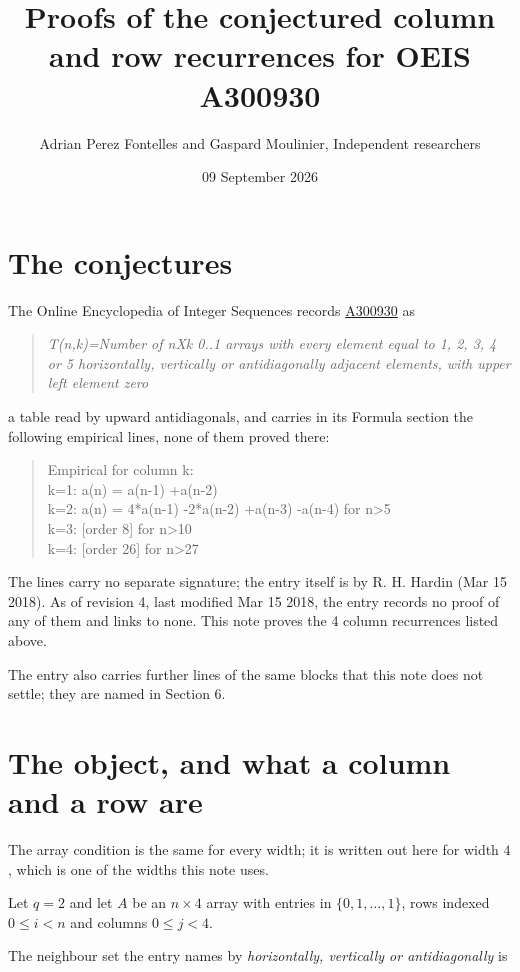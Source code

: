 \documentclass[11pt]{article}
\title{Proofs of the conjectured column and row recurrences for OEIS A300930}
\author{Adrian Perez Fontelles and Gaspard Moulinier, Independent researchers}
\date{09 September 2026}
\theoremstyle{definition}
\begin{document}
\maketitle
\section{The conjectures}

The Online Encyclopedia of Integer Sequences records \href{https://oeis.org/A300930}{A300930} as

\begin{quote}\itshape T(n,k)=Number of nXk 0..1 arrays with every element equal to 1, 2, 3, 4 or 5 horizontally, vertically or antidiagonally adjacent elements, with upper left element zero\end{quote}

a table read by upward antidiagonals, and carries in its Formula section the following empirical lines, none of them proved there:

\begin{quote}\ttfamily Empirical for column k:\\
k=1: a(n) = a(n-1) +a(n-2)\\k=2: a(n) = 4*a(n-1) -2*a(n-2) +a(n-3) -a(n-4) for n>5\\k=3: [order 8] for n>10\\k=4: [order 26] for n>27\end{quote}

The lines carry no separate signature; the entry itself is by R. H. Hardin (Mar 15 2018). As of revision 4, last modified Mar 15 2018, the entry records no proof of any of them and links to none. This note proves the 4 column recurrences listed above.

The entry also carries further lines of the same blocks that this note does not settle; they are named in Section 6.

\section{The object, and what a column and a row are}

The array condition is the same for every width; it is written out here for width $4$, which is one of the widths this note uses.

Let $q = 2$ and let $A$ be an $n \times 4$ array with entries in $\{0,1,\dots,1\}$, rows indexed $0 \le i < n$ and columns $0 \le j < 4$.

The neighbour set the entry names by {\itshape horizontally, vertically or antidiagonally} is
\end{document}
